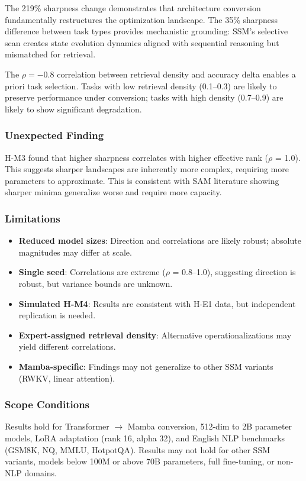 
The 219\% sharpness change demonstrates that architecture conversion fundamentally restructures the optimization landscape. The 35\% sharpness difference between task types provides mechanistic grounding: SSM's selective scan creates state evolution dynamics aligned with sequential reasoning but mismatched for retrieval.

The $\rho = -0.8$ correlation between retrieval density and accuracy delta enables a priori task selection. Tasks with low retrieval density (0.1--0.3) are likely to preserve performance under conversion; tasks with high density (0.7--0.9) are likely to show significant degradation.

\subsubsection{Unexpected Finding}

H-M3 found that higher sharpness correlates with higher effective rank ($\rho$ = 1.0). This suggests sharper landscapes are inherently more complex, requiring more parameters to approximate. This is consistent with SAM literature showing sharper minima generalize worse and require more capacity.

\subsubsection{Limitations}

\begin{itemize}
\item \textbf{Reduced model sizes}: Direction and correlations are likely robust; absolute magnitudes may differ at scale.
\item \textbf{Single seed}: Correlations are extreme ($\rho$ = 0.8--1.0), suggesting direction is robust, but variance bounds are unknown.
\item \textbf{Simulated H-M4}: Results are consistent with H-E1 data, but independent replication is needed.
\item \textbf{Expert-assigned retrieval density}: Alternative operationalizations may yield different correlations.
\item \textbf{Mamba-specific}: Findings may not generalize to other SSM variants (RWKV, linear attention).
\end{itemize}

\subsubsection{Scope Conditions}

Results hold for Transformer $\rightarrow$ Mamba conversion, 512-dim to 2B parameter models, LoRA adaptation (rank 16, alpha 32), and English NLP benchmarks (GSM8K, NQ, MMLU, HotpotQA). Results may not hold for other SSM variants, models below 100M or above 70B parameters, full fine-tuning, or non-NLP domains.

